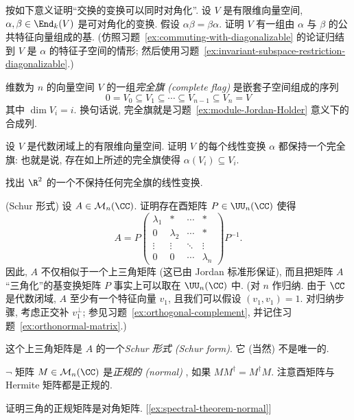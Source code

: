 \begin{prob}\label{ex:simultaneously-diagonalizable}
按如下意义证明``交换的变换可以同时对角化''. 设 $V$ 是有限维向量空间, $\alpha,\beta\in\End_k(V)$ 是可对角化的变换. 假设 $\alpha\beta=\beta\alpha$. 证明 $V$ 有一组由 $\alpha$ 与 $\beta$ 的公共特征向量组成的基. (仿照习题~\ref{ex:commuting-with-diagonalizable} 的论证归结到 $V$ 是 $\alpha$ 的特征子空间的情形; 然后使用习题~\ref{ex:invariant-subspace-restriction-diagonalizable}.)
\end{prob}

\begin{prob}\label{ex:complete-flag}
维数为 $n$ 的向量空间 $V$ 的一组\emph{完全旗 (complete flag)}
是嵌套子空间组成的序列
\[
0=V_0\subseteq V_1\subseteq\cdots\subseteq V_{n-1}\subseteq V_n=V
\]
其中 $\dim V_i=i$. 换句话说, 完全旗就是习题~\ref{ex:module-Jordan-Holder} 意义下的合成列.

设 $V$ 是代数闭域上的有限维向量空间. 证明 $V$ 的每个线性变换 $\alpha$ 都保持一个完全旗: 也就是说, 存在如上所述的完全旗使得 $\alpha(V_i)\subseteq V_i$.

找出 $\R^2$ 的一个不保持任何完全旗的线性变换.
\end{prob}

\begin{prob}\label{ex:schur-form}
(Schur 形式) 设 $A\in\mathcal{M}_n(\CC)$. 证明存在酉矩阵 $P\in\UU_n(\CC)$ 使得
\[
A=P\begin{pmatrix}
\lambda_1&*&\cdots&*\\
0&\lambda_2&\cdots&*\\
\vdots&\vdots&\ddots&\vdots\\
0&0&\cdots&\lambda_n
\end{pmatrix}P^{-1}.
\]
因此, $A$ 不仅相似于一个上三角矩阵 (这已由 Jordan 标准形保证), 而且把矩阵 $A$``三角化''的基变换矩阵 $P$ 事实上可以取在 $\UU_n(\CC)$ 中. (对 $n$ 作归纳. 由于 $\CC$ 是代数闭域, $A$ 至少有一个特征向量 $v_1$, 且我们可以假设 $(v_1,v_1)=1$. 对归纳步骤, 考虑正交补 $v_1^\perp$; 参见习题~\ref{ex:orthogonal-complement}, 并记住习题~\ref{ex:orthonormal-matrix}.)

这个上三角矩阵是 $A$ 的一个\emph{Schur 形式 (Schur form)}. 它 (当然) 不是唯一的.
\end{prob}

\begin{prob}\label{ex:triangular-normal-diagonal}
$\neg$ 矩阵 $M\in\mathcal{M}_n(\CC)$ 是\emph{正规的 (normal)}
, 如果 $MM^{\dagger}=M^{\dagger}M$. 注意酉矩阵与 Hermite 矩阵都是正规的.

证明三角的正规矩阵是对角矩阵. [\ref{ex:spectral-theorem-normal}]
\end{prob}

